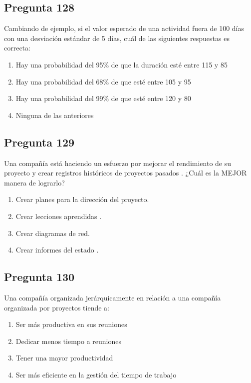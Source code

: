 \documentclass[11pt,a4paper]{article}
\begin{document}
\subsection*{Pregunta 128}
Cambiando de ejemplo, si el valor esperado de una actividad fuera de 100 días con una desviación estándar de 5 días, cuál de las siguientes respuestas es correcta:

\begin{enumerate}[label=\alph*)]
  \item Hay una probabilidad del 95\% de que la duración esté entre 115 y 85
  \item Hay una probabilidad del 68\% de que esté entre 105 y 95
  \item Hay una probabilidad del 99\% de que esté entre 120 y 80
  \item Ninguna de las anteriores
\end{enumerate}

\subsection*{Pregunta 129}
Una compañía está haciendo un esfuerzo por mejorar el rendimiento de su proyecto y crear registros históricos de proyectos pasados . ¿Cuál es la MEJOR manera de lograrlo?

\begin{enumerate}[label=\alph*)]
  \item Crear planes para la dirección del proyecto.
  \item Crear lecciones aprendidas .
  \item Crear diagramas de red.
  \item Crear informes del estado .
\end{enumerate}

\subsection*{Pregunta 130}
Una compañía organizada jerárquicamente en relación a una compañía organizada por proyectos tiende a:

\begin{enumerate}[label=\alph*)]
  \item Ser más productiva en sus reuniones
  \item Dedicar menos tiempo a reuniones
  \item Tener una mayor productividad
  \item Ser más eficiente en la gestión del tiempo de trabajo
\end{enumerate}
\end{document}
